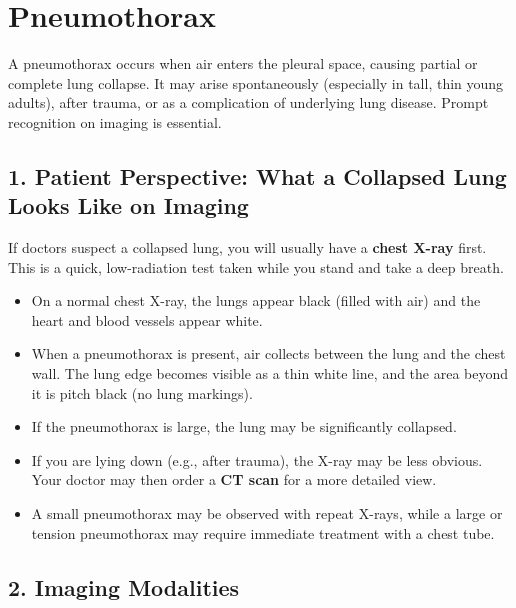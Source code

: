 \chapter{Pneumothorax}

\label{ch:ch75_pneumothorax}

A pneumothorax occurs when air enters the pleural space, causing partial or complete lung collapse. It may arise spontaneously (especially in tall, thin young adults), after trauma, or as a complication of underlying lung disease. Prompt recognition on imaging is essential.


\section{1. Patient Perspective: What a Collapsed Lung Looks Like on Imaging}

If doctors suspect a collapsed lung, you will usually have a \textbf{chest X-ray} first. This is a quick, low-radiation test taken while you stand and take a deep breath.

\begin{itemize}
  \item On a normal chest X-ray, the lungs appear black (filled with air) and the heart and blood vessels appear white.
  \item When a pneumothorax is present, air collects between the lung and the chest wall. The lung edge becomes visible as a thin white line, and the area beyond it is pitch black (no lung markings).
  \item If the pneumothorax is large, the lung may be significantly collapsed.
  \item If you are lying down (e.g., after trauma), the X-ray may be less obvious. Your doctor may then order a \textbf{CT scan} for a more detailed view.
  \item A small pneumothorax may be observed with repeat X-rays, while a large or tension pneumothorax may require immediate treatment with a chest tube.
\end{itemize}


\section{2. Imaging Modalities}

